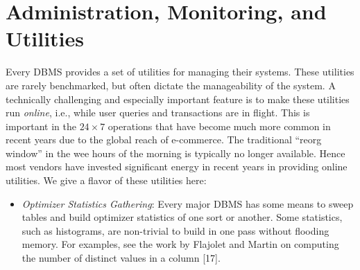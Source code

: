 \documentclass[b5paper,11pt,twoside,openright]{book}
\begin{document}
\hypertarget{administration-monitoring-and-utilities}{%
\section{Administration, Monitoring, and
Utilities}\label{administration-monitoring-and-utilities}}

Every DBMS provides a set of utilities for managing their systems. These
utilities are rarely benchmarked, but often dictate the manageability of
the system. A technically challenging and especially important feature
is to make these utilities run \emph{online}, i.e., while user queries
and transactions are in flight. This is important in the $24 \times 7$
operations that have become much more common in recent years due to the
global reach of e-commerce. The traditional ``reorg window'' in the wee
hours of the morning is typically no longer available. Hence most
vendors have invested significant energy in recent years in providing
online utilities. We give a flavor of these utilities here:

\begin{itemize}

\item
  \emph{Optimizer Statistics Gathering}: Every major DBMS has some means
  to sweep tables and build optimizer statistics of one sort or another.
  Some statistics, such as histograms, are non-trivial to build in one
  pass without flooding memory. For examples, see the work by Flajolet
  and Martin on computing the number of distinct values in a column
  {[}17{]}.
\end{itemize}
\end{document}
